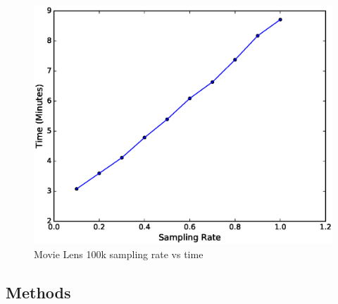 \documentclass{sig-alternate-05-2015}
\begin{document}
\begin{figure}[H]
\centering
\includegraphics[width=\columnwidth]{../images/experiment-results/movie-lens-100k-sampling-time.eps}
\caption{Movie Lens 100k sampling rate vs time}
\label{fig:movie-lens-100k-sample-rate-time}
\end{figure}
%
%
%
%
%
%



\subsection{Methods}
\end{document}
